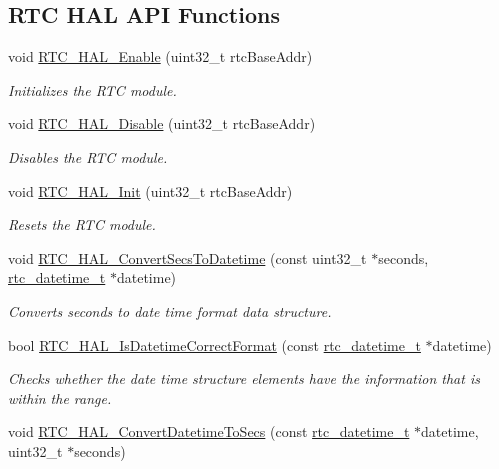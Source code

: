 \subsection*{R\+TC H\+AL A\+PI Functions}
\begin{DoxyCompactItemize}
\item 
void \hyperlink{group__rtc__hal_ga097db04ecc4ded251b0743fc7074f155}{R\+T\+C\+\_\+\+H\+A\+L\+\_\+\+Enable} (uint32\+\_\+t rtc\+Base\+Addr)
\begin{DoxyCompactList}\small\item\em Initializes the R\+TC module. \end{DoxyCompactList}\item 
void \hyperlink{group__rtc__hal_gac751af767a41c67ea9a320905c9b7de2}{R\+T\+C\+\_\+\+H\+A\+L\+\_\+\+Disable} (uint32\+\_\+t rtc\+Base\+Addr)
\begin{DoxyCompactList}\small\item\em Disables the R\+TC module. \end{DoxyCompactList}\item 
void \hyperlink{group__rtc__hal_gaf0596d13b9de9cc88dc4176936d0898a}{R\+T\+C\+\_\+\+H\+A\+L\+\_\+\+Init} (uint32\+\_\+t rtc\+Base\+Addr)
\begin{DoxyCompactList}\small\item\em Resets the R\+TC module. \end{DoxyCompactList}\item 
void \hyperlink{group__rtc__hal_ga551804764741c28b3fb0591a1e54c57a}{R\+T\+C\+\_\+\+H\+A\+L\+\_\+\+Convert\+Secs\+To\+Datetime} (const uint32\+\_\+t $\ast$seconds, \hyperlink{group__rtc__hal_ga079a66794dec7b821f9f5fdb6c7c8642}{rtc\+\_\+datetime\+\_\+t} $\ast$datetime)
\begin{DoxyCompactList}\small\item\em Converts seconds to date time format data structure. \end{DoxyCompactList}\item 
bool \hyperlink{group__rtc__hal_ga69abdba3fea196506e19d70fe61b6cd0}{R\+T\+C\+\_\+\+H\+A\+L\+\_\+\+Is\+Datetime\+Correct\+Format} (const \hyperlink{group__rtc__hal_ga079a66794dec7b821f9f5fdb6c7c8642}{rtc\+\_\+datetime\+\_\+t} $\ast$datetime)
\begin{DoxyCompactList}\small\item\em Checks whether the date time structure elements have the information that is within the range. \end{DoxyCompactList}\item 
void \hyperlink{group__rtc__hal_ga84abf46938a553b62603cf69d2355adb}{R\+T\+C\+\_\+\+H\+A\+L\+\_\+\+Convert\+Datetime\+To\+Secs} (const \hyperlink{group__rtc__hal_ga079a66794dec7b821f9f5fdb6c7c8642}{rtc\+\_\+datetime\+\_\+t} $\ast$datetime, uint32\+\_\+t $\ast$seconds)

\end{DoxyCompactItemize}
